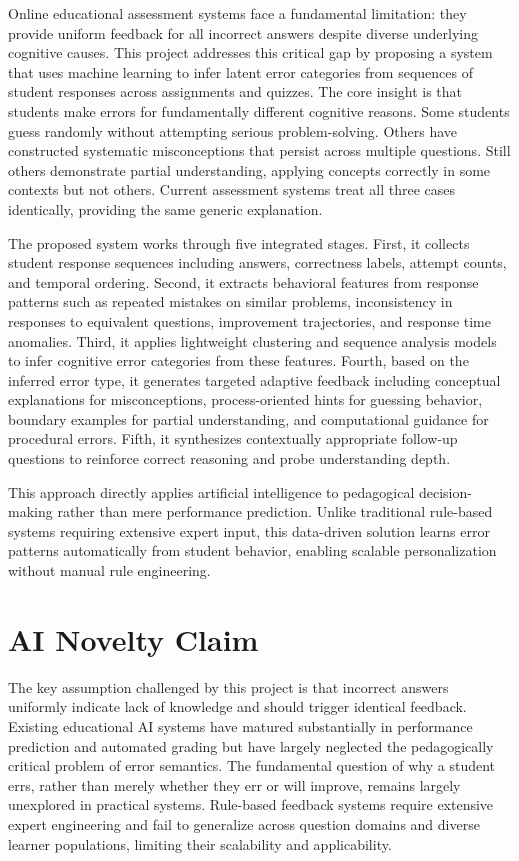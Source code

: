 \documentclass[conference]{IEEEtran}
\begin{document}
Online educational assessment systems face a fundamental limitation: they provide uniform feedback for all incorrect answers despite diverse underlying cognitive causes. This project addresses this critical gap by proposing a system that uses machine learning to infer latent error categories from sequences of student responses across assignments and quizzes. The core insight is that students make errors for fundamentally different cognitive reasons. Some students guess randomly without attempting serious problem-solving. Others have constructed systematic misconceptions that persist across multiple questions. Still others demonstrate partial understanding, applying concepts correctly in some contexts but not others. Current assessment systems treat all three cases identically, providing the same generic explanation.

The proposed system works through five integrated stages. First, it collects student response sequences including answers, correctness labels, attempt counts, and temporal ordering. Second, it extracts behavioral features from response patterns such as repeated mistakes on similar problems, inconsistency in responses to equivalent questions, improvement trajectories, and response time anomalies. Third, it applies lightweight clustering and sequence analysis models to infer cognitive error categories from these features. Fourth, based on the inferred error type, it generates targeted adaptive feedback including conceptual explanations for misconceptions, process-oriented hints for guessing behavior, boundary examples for partial understanding, and computational guidance for procedural errors. Fifth, it synthesizes contextually appropriate follow-up questions to reinforce correct reasoning and probe understanding depth.

This approach directly applies artificial intelligence to pedagogical decision-making rather than mere performance prediction. Unlike traditional rule-based systems requiring extensive expert input, this data-driven solution learns error patterns automatically from student behavior, enabling scalable personalization without manual rule engineering.

\section{AI Novelty Claim}

The key assumption challenged by this project is that incorrect answers uniformly indicate lack of knowledge and should trigger identical feedback. Existing educational AI systems have matured substantially in performance prediction and automated grading but have largely neglected the pedagogically critical problem of error semantics. The fundamental question of why a student errs, rather than merely whether they err or will improve, remains largely unexplored in practical systems. Rule-based feedback systems require extensive expert engineering and fail to generalize across question domains and diverse learner populations, limiting their scalability and applicability.
\end{document}
